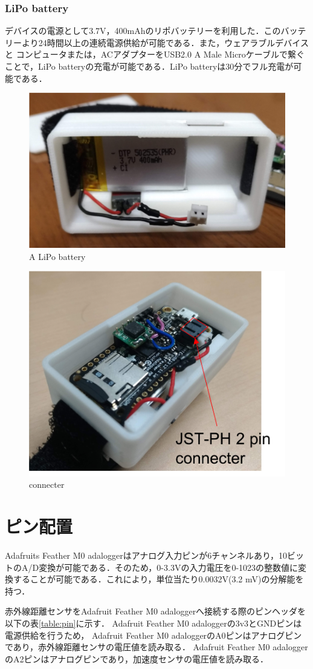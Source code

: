 \subsubsection*{LiPo battery}
デバイスの電源として3.7V，400mAhのリポバッテリーを利用した．このバッテリーより24時間以上の連続電源供給が可能である．また，ウェアラブルデバイスと
コンピュータまたは，ACアダプターをUSB2.0 A Male Microケーブルで繋ぐことで，LiPo batteryの充電が可能である．LiPo batteryは30分でフル充電が可能である．
\begin{figure}[H]
  \centering
  \includegraphics[width=0.5\linewidth]{fig/battery}
  \caption{A LiPo battery}
  \label{fig:battery}
\end{figure}

\begin{figure}[H]
  \centering
  \includegraphics[width=0.3\linewidth]{fig/ph}
  \caption{connecter}
  \label{fig:connecter}
\end{figure}

\section{ピン配置}
Adafruits Feather M0 adaloggerはアナログ入力ピンが6チャンネルあり，10ビットのA/D変換が可能である．そのため，0-3.3Vの入力電圧を0-1023の整数値に変換することが可能である．これにより，単位当たり0.0032V(3.2 mV)の分解能を持つ．

赤外線距離センサをAdafruit Feather M0 adaloggerへ接続する際のピンヘッダを以下の表\ref{table:pin}に示す．
Adafruit Feather M0 adaloggerの3v3とGNDピンは電源供給を行うため，
Adafruit Feather M0 adaloggerのA0ピンはアナログピンであり，赤外線距離センサの電圧値を読み取る．
Adafruit Feather M0 adaloggerのA2ピンはアナログピンであり，加速度センサの電圧値を読み取る．


